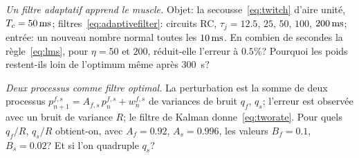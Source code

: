 \begin{exercise}[\lvlB]
\label{ex:15:6}
\emph{Un filtre adaptatif apprend le muscle.} Objet: la secousse~\eqref{eq:twitch} d'aire unité, $T_c=50\,\text{ms}$; filtres~\eqref{eq:adaptivefilter}: circuits RC, $\tau_j=12.5$, $25$, $50$, $100$, $200\,\text{ms}$; entrée: un nouveau nombre normal toutes les $10\,\text{ms}$. En combien de secondes la règle~\eqref{eq:lms}, pour $\eta=50$ et $200$, réduit-elle l'erreur à $0.5\%$? Pourquoi les poids restent-ils loin de l'optimum même après $300$~s?
\end{exercise}

\begin{exercise}[\lvlC]
\label{ex:15:7}
\emph{Deux processus comme filtre optimal.} La perturbation est la somme de deux processus $p^{f,s}_{n+1}=A_{f,s}\,p^{f,s}_n+w^{f,s}_n$ de variances de bruit $q_f$, $q_s$; l'erreur est observée avec un bruit de variance $R$; le filtre de Kalman donne~\eqref{eq:tworate}. Pour quels $q_f/R$, $q_s/R$ obtient-on, avec $A_f=0.92$, $A_s=0.996$, les valeurs $B_f=0.1$, $B_s=0.02$? Et si l'on quadruple $q_s$?
\end{exercise}
